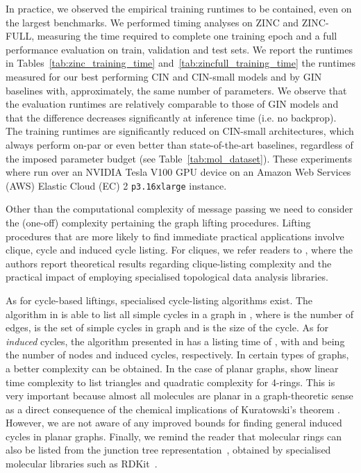 \documentclass{article}
\begin{document}
In practice, we observed the empirical training runtimes to be contained, even on the largest benchmarks. We performed timing analyses on ZINC and ZINC-FULL, measuring the time required to complete one training epoch and a full performance evaluation on train, validation and test sets. We report the runtimes in Tables~\ref{tab:zinc_training_time} and~\ref{tab:zincfull_training_time} the runtimes measured for our best performing CIN and CIN-small models and by GIN baselines with, approximately, the same number of parameters. We observe that the evaluation runtimes are relatively comparable to those of GIN models and that the difference decreases significantly at inference time (i.e. no backprop). The training runtimes are significantly reduced on CIN-small architectures, which always perform on-par or even better than state-of-the-art baselines, regardless of the imposed parameter budget (see Table~\ref{tab:mol_dataset}). These experiments where run over an NVIDIA\textsuperscript{\textregistered} Tesla V100 GPU device on an Amazon Web Services (AWS) Elastic Cloud (EC) 2 \texttt{p3.16xlarge} instance.

Other than the computational complexity of message passing we need to consider the (one-off) complexity pertaining the graph lifting procedures. Lifting procedures that are more likely to find immediate practical applications involve clique, cycle and induced cycle listing. For cliques, we refer readers to \citet{bodnar2021weisfeiler}, where the authors report theoretical results regarding clique-listing complexity and the practical impact of employing specialised topological data analysis libraries. 

As for cycle-based liftings, specialised cycle-listing algorithms exist. The algorithm in \citet{birmele2013optimal} is able to list all simple cycles in a graph in , where  is the number of edges,  is the set of simple cycles in graph  and  is the size of the cycle. As for \emph{induced} cycles, the algorithm presented in \citet{ferreira2014amortized} has a listing time of , with  and  being the number of nodes and induced cycles, respectively. In certain types of graphs, a better complexity can be obtained. In the case of planar graphs, \citet{chiba1985arboricity} show linear time complexity to list triangles and quadratic complexity for 4-rings. This is very important because almost all molecules are planar in a graph-theoretic sense \citep{SIMMONS1981287} as a direct consequence of the chemical implications of Kuratowski's theorem \citep{kuratowski1930probleme}. However, we are not aware of any improved bounds for finding general induced cycles in planar graphs. Finally, we remind the reader that molecular rings can also be listed from the junction tree representation~\citep{jin2018junction, Fey2020_himp}, obtained by specialised molecular libraries such as RDKit~\citep{Landrum2016RDKit2016_09_4}.
\end{document}
